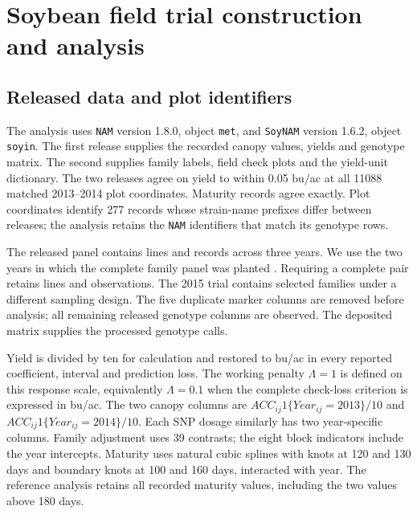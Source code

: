 \section{Soybean field trial construction and analysis}\label{supp:soynam}


\subsection{Released data and plot identifiers}

The analysis uses \texttt{NAM} version 1.8.0, object \texttt{met},
and \texttt{SoyNAM} version 1.6.2, object \texttt{soyin}. The first
release supplies the recorded canopy values, yields and genotype
matrix. The second supplies family labels, field check plots and the
yield-unit dictionary. The two releases agree on yield to within
0.05 bu/ac at all 11088 matched 2013--2014 plot coordinates. Maturity
records agree exactly. Plot coordinates identify 277 records whose
strain-name prefixes differ between releases; the analysis retains
the \texttt{NAM} identifiers that match its genotype rows.

The released panel contains \SoyOriginalLines{} lines and
\SoyOriginalRecords{} records across three years. We use the two
years in which the complete family panel was planted
\cite{xavier2017canopy}. Requiring a complete pair retains
\SoyLines{} lines and \SoyRecords{} observations. The 2015 trial
contains selected families under a different sampling design.
The five duplicate marker columns are removed before analysis;
all remaining \SoyMarkers{} released genotype columns are observed.
The deposited matrix supplies the processed genotype calls.



Yield is divided by ten for calculation and restored to bu/ac in
every reported coefficient, interval and prediction loss. The working
penalty $\Lambda=1$ is defined on this response scale, equivalently
$\Lambda=0.1$ when the complete check-loss criterion is expressed in
bu/ac. The two
canopy columns are $ACC_{ij}1\{Year_{ij}=2013\}/10$ and
$ACC_{ij}1\{Year_{ij}=2014\}/10$. Each SNP dosage similarly has two
year-specific columns. Family adjustment uses 39 contrasts; the eight
block indicators include the year intercepts. Maturity uses natural
cubic splines with knots at 120 and 130 days and boundary knots at
100 and 160 days, interacted with year. The reference analysis retains
all recorded maturity values, including the two values above 180 days.

